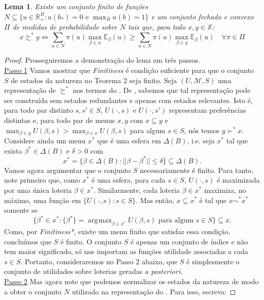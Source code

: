 \documentclass[12pt, a4paper]{article}
\theoremstyle{nonumberplain}
\newtheorem{proof}{Dem.}
\theoremstyle{plain}
\theoremstyle{plain}
\theoremstyle{plain}
\newtheorem{lemma}{Lema}
\theoremstyle{nonumberplain}
\DeclareMathOperator*{\argmax}{\arg\!\max}
\begin{document}
\begin{lemma}\label{nossoKochov} Existe um conjunto finito de funções $N\subseteq\{u \in \mathbb{R}^B_+:u(b_*)=0\text { e }\max_{B}u(b)=1\}$ e um conjunto fechado e convexo $\Pi$ de medidas de probabilidade sobre $N$ tais que, para todo $x,y\in\mathbb{X}$:
$$x\succsim^* y \Leftrightarrow \sum_{u\in N} \pi(u)\max_{\beta\in x}\mathbb{E}_\beta(u) \geq \sum_{u\in N} \pi(u)\max_{\beta\in y}\mathbb{E}_\beta(u)\quad \forall\pi\in\Pi$$
\end{lemma}
\begin{proof}
Prosseguiremos a demonstração do lema em três passos.\\
\underline{Passo 1} Vamos mostrar que \emph{Finitiness} é condição suficiente para que o conjunto $S$ de estados da natureza no Teorema 2 seja finito. Seja $(U,\mathcal{M},S)$ uma representação de $\succsim^*$ nos termos do . De \cite{Kochov2007}, sabemos que tal representação pode ser construída sem estados redundantes e apenas com estados relevantes. Isto é, para todo par distinto $s,s'\in S$, $U(\cdot,s)$ e $U(\cdot,s')$ representam preferências distintas e, para todo par de menus $x,y$ com $x\subseteq y$ e $\max_{\beta \in y}U(\beta,s)>\max_{\beta \in x}U(\beta,s)$ para algum $s\in S$, nós temos $y\succ^* x$. Considere ainda um menu $x^*$ que é uma esfera em $\Delta (B)$, i.e. seja $x^*$ tal que exista $\beta^*\in\Delta(B)$ e $\delta>0$ com $$x^*=\{\beta\in\Delta(B):||\beta-\beta^*||\leq\delta\}\subseteq\Delta(B).$$
Vamos agora argumentar que o conjunto $S$ necessariamente é finito. Para tanto, note primeiro que, como $x^*$ é uma esfera, para cada $s\in S$, $U(\cdot,s)$ é maximizada por uma única loteria $\beta\in x^*$. Similarmente, cada loteria $\beta\in x^*$ maximiza, no máximo, uma função em $\{U(\cdot,s): s\in S\}$. Mas então, $x\subseteq x^*$ é tal que $x\sim^* x^*$ somente se $$\{\beta^* \in x^* : \{\beta^*\}=\argmax_{\beta\in x^*} U(\beta,s)\text{ para algum }s\in S\} \subseteq x.$$ Como, por \emph{Finitiness*}, existe um menu finito que satisfaz essa condição, concluímos que $S$ é finito.
O conjunto $S$ é apenas um conjunto de índice e não tem maior significado, só nos importam as funções utilidade associadas a cada $s\in S$. Portanto, consideraremos no Passo 2 abaixo, que $S$ é simplesmente o conjunto de utilidades sobre loterias geradas \emph{a posteriori}.
\\
\noindent
\underline{Passo 2} Mas agora note que podemos normalizar os estados da natureza de modo a obter o conjunto $N$ utilizado na representação do . Para isso, escreva:

\end{proof}
\end{document}
